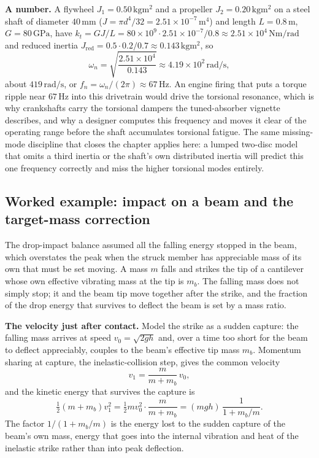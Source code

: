 \textbf{A number.} A flywheel $J_1 = 0.50\,\si{\kilogram\meter\squared}$ and
a propeller $J_2 = 0.20\,\si{\kilogram\meter\squared}$ on a steel shaft of
diameter $40\,\si{\milli\meter}$ ($J = \pi d^4/32 = 2.51\times 10^{-7}\,\si
{\meter\tothe{4}}$) and length $L = 0.8\,\si{\meter}$, $G = 80\,\si{\giga
\pascal}$, have $k_t = GJ/L = 80\times 10^{9}\cdot 2.51\times 10^{-7}/0.8
\approx 2.51\times 10^{4}\,\si{\newton\meter\per\radian}$ and reduced inertia
$J_{\mathrm{red}} = 0.5\cdot 0.2/0.7 \approx 0.143\,\si{\kilogram\meter
\squared}$, so
\[
\omega_n = \sqrt{\frac{2.51\times 10^{4}}{0.143}}
\approx 4.19\times 10^{2}\,\si{\radian\per\second},
\]
about $419\,\si{\radian\per\second}$, or $f_n = \omega_n/(2\pi) \approx
67\,\si{\hertz}$. An engine firing that puts a torque ripple near
$67\,\si{\hertz}$ into this drivetrain would drive the torsional resonance,
which is why crankshafts carry the torsional dampers the tuned-absorber
vignette describes, and why a designer computes this frequency and moves it
clear of the operating range before the shaft accumulates torsional fatigue.
The same missing-mode discipline that closes the chapter applies here: a
lumped two-disc model that omits a third inertia or the shaft's own
distributed inertia will predict this one frequency correctly and miss the
higher torsional modes entirely.

\subsection{Worked example: impact on a beam and the target-mass correction}

The drop-impact balance assumed all the falling energy stopped in the beam,
which overstates the peak when the struck member has appreciable mass of its
own that must be set moving. A mass $m$ falls and strikes the tip of a
cantilever whose own effective vibrating mass at the tip is $m_b$. The falling
mass does not simply stop; it and the beam tip move together after the strike,
and the fraction of the drop energy that survives to deflect the beam is set
by a mass ratio.

\textbf{The velocity just after contact.} Model the strike as a sudden capture:
the falling mass arrives at speed $v_0 = \sqrt{2gh}$ and, over a time too short
for the beam to deflect appreciably, couples to the beam's effective tip mass
$m_b$. Momentum sharing at capture, the inelastic-collision step, gives the
common velocity
\[
v_1 = \frac{m}{m + m_b}\,v_0,
\]
and the kinetic energy that survives the capture is
\[
\tfrac12(m + m_b)v_1^2
= \tfrac12 m v_0^2\cdot\frac{m}{m + m_b}
= (mgh)\,\frac{1}{1 + m_b/m}.
\]
The factor $1/(1 + m_b/m)$ is the energy lost to the sudden capture of the
beam's own mass, energy that goes into the internal vibration and heat of the
inelastic strike rather than into peak deflection.

